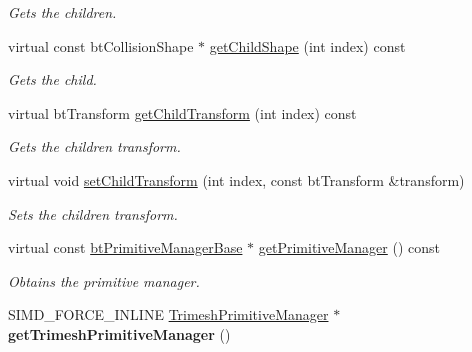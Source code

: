 \begin{DoxyCompactItemize}
\begin{DoxyCompactList}\small\item\em Gets the children. \end{DoxyCompactList}\item 
\mbox{\label{classbtGImpactMeshShapePart_acd6de27502bdfbb0a87b4a2fe968fe1e}} 
virtual const bt\+Collision\+Shape $\ast$ \hyperlink{classbtGImpactMeshShapePart_acd6de27502bdfbb0a87b4a2fe968fe1e}{get\+Child\+Shape} (int index) const
\begin{DoxyCompactList}\small\item\em Gets the child. \end{DoxyCompactList}\item 
\mbox{\label{classbtGImpactMeshShapePart_a03e59197abe75fe7b054e5a3a9c51278}} 
virtual bt\+Transform \hyperlink{classbtGImpactMeshShapePart_a03e59197abe75fe7b054e5a3a9c51278}{get\+Child\+Transform} (int index) const
\begin{DoxyCompactList}\small\item\em Gets the children transform. \end{DoxyCompactList}\item 
virtual void \hyperlink{classbtGImpactMeshShapePart_a0a97d3769fb7d3f583e41da6b284bcc1}{set\+Child\+Transform} (int index, const bt\+Transform \&transform)
\begin{DoxyCompactList}\small\item\em Sets the children transform. \end{DoxyCompactList}\item 
\mbox{\label{classbtGImpactMeshShapePart_addf40f1b9524952475789da7451e9575}} 
virtual const \hyperlink{classbtPrimitiveManagerBase}{bt\+Primitive\+Manager\+Base} $\ast$ \hyperlink{classbtGImpactMeshShapePart_addf40f1b9524952475789da7451e9575}{get\+Primitive\+Manager} () const
\begin{DoxyCompactList}\small\item\em Obtains the primitive manager. \end{DoxyCompactList}\item 
\mbox{\label{classbtGImpactMeshShapePart_a7b6bceae8902afd9d35a734899f07c7b}} 
S\+I\+M\+D\+\_\+\+F\+O\+R\+C\+E\+\_\+\+I\+N\+L\+I\+NE \hyperlink{classbtGImpactMeshShapePart_1_1TrimeshPrimitiveManager}{Trimesh\+Primitive\+Manager} $\ast$ {\bfseries get\+Trimesh\+Primitive\+Manager} ()

\end{DoxyCompactItemize}
